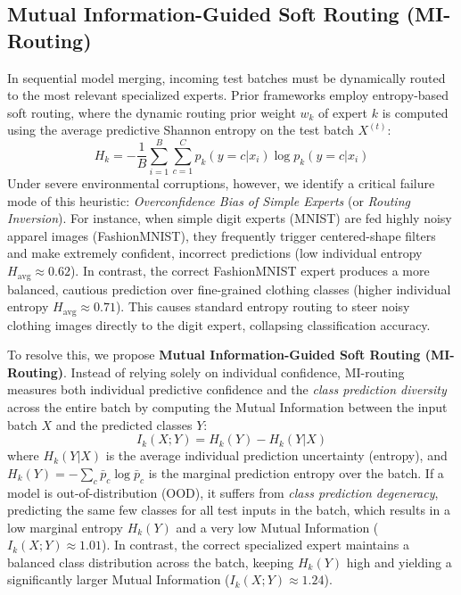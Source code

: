 \documentclass{article}
\theoremstyle{plain}
\theoremstyle{definition}
\theoremstyle{remark}
\begin{document}
\subsection{Mutual Information-Guided Soft Routing (MI-Routing)}
In sequential model merging, incoming test batches must be dynamically routed to the most relevant specialized experts. Prior frameworks employ entropy-based soft routing, where the dynamic routing prior weight $w_k$ of expert $k$ is computed using the average predictive Shannon entropy on the test batch $X^{(t)}$:
\begin{equation}
  H_k = -\frac{1}{B} \sum_{i=1}^B \sum_{c=1}^C p_k(y=c|x_i) \log p_k(y=c|x_i)
\end{equation}
Under severe environmental corruptions, however, we identify a critical failure mode of this heuristic: \emph{Overconfidence Bias of Simple Experts} (or \emph{Routing Inversion}). For instance, when simple digit experts (MNIST) are fed highly noisy apparel images (FashionMNIST), they frequently trigger centered-shape filters and make extremely confident, incorrect predictions (low individual entropy $H_{\text{avg}} \approx 0.62$). In contrast, the correct FashionMNIST expert produces a more balanced, cautious prediction over fine-grained clothing classes (higher individual entropy $H_{\text{avg}} \approx 0.71$). This causes standard entropy routing to steer noisy clothing images directly to the digit expert, collapsing classification accuracy.

To resolve this, we propose \textbf{Mutual Information-Guided Soft Routing (MI-Routing)}. Instead of relying solely on individual confidence, MI-routing measures both individual predictive confidence and the \emph{class prediction diversity} across the entire batch by computing the Mutual Information between the input batch $X$ and the predicted classes $Y$:
\begin{equation}
  I_k(X; Y) = H_k(Y) - H_k(Y|X)
\end{equation}
where $H_k(Y|X)$ is the average individual prediction uncertainty (entropy), and $H_k(Y) = -\sum_c \bar{p}_c \log \bar{p}_c$ is the marginal prediction entropy over the batch. If a model is out-of-distribution (OOD), it suffers from \emph{class prediction degeneracy}, predicting the same few classes for all test inputs in the batch, which results in a low marginal entropy $H_k(Y)$ and a very low Mutual Information ($I_k(X; Y) \approx 1.01$). In contrast, the correct specialized expert maintains a balanced class distribution across the batch, keeping $H_k(Y)$ high and yielding a significantly larger Mutual Information ($I_k(X; Y) \approx 1.24$).
\end{document}
